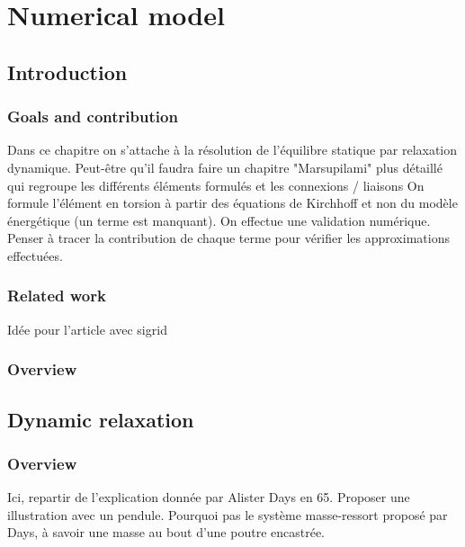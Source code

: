 
\chapter{Numerical model}

\section{Introduction}

\subsection{Goals and contribution}
Dans ce chapitre on s'attache à la résolution de l'équilibre statique par relaxation dynamique.
Peut-être qu'il faudra faire un chapitre "Marsupilami" plus détaillé qui regroupe les différents éléments formulés et les connexions / liaisons
On formule l'élément en torsion à partir des équations de Kirchhoff et non du modèle énergétique (un terme est manquant).
On effectue une validation numérique. Penser à tracer la contribution de chaque terme pour vérifier les approximations effectuées.

\subsection{Related work}
\cite{Day1965}
\cite{Otter1965}
\cite{Papadrakakis1981}
\cite{Miki2014}
\cite{Alamatian2012}
\cite{Rezaiee-pajand2011a}

Idée pour l'article avec sigrid \cite{Alamatian2012}

\subsection{Overview}

\section{Dynamic relaxation}

\subsection{Overview}
Ici, repartir de l'explication donnée par Alister Days en 65.
Proposer une illustration avec un pendule. Pourquoi pas le système masse-ressort proposé par Days, à savoir une masse au bout d'une poutre encastrée.

